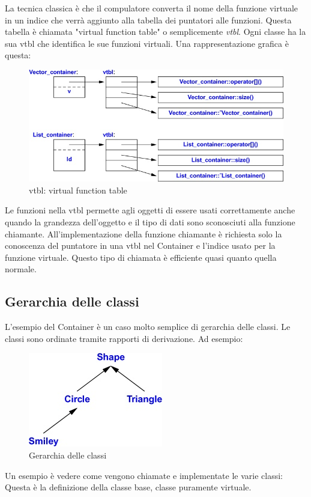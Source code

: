\documentclass[11pt,a4paper]{book}
\begin{document}
La tecnica classica è che il compulatore converta il nome della funzione virtuale in un indice che verrà aggiunto alla tabella dei puntatori alle funzioni. Questa tabella è chiamata "virtual function table" o semplicemente \emph{vtbl}. Ogni classe ha la sua vtbl che identifica le sue funzioni virtuali. Una rappresentazione grafica è questa:
\begin{figure}[h!]
	\begin{center}
		\includegraphics[scale=0.6]{img/004.jpg}
		\caption{vtbl: virtual function table}
		\label{fig: 004}
	\end{center}
\end{figure}

Le funzioni nella vtbl permette agli oggetti di essere usati correttamente anche quando la grandezza dell'oggetto e il tipo di dati sono sconosciuti alla funzione chiamante. All'implementazione della funzione chiamante è richiesta solo la conoscenza del puntatore in una vtbl nel Container e l'indice usato per la funzione virtuale. Questo tipo di chiamata è efficiente quasi quanto quella normale.

\subsection{Gerarchia delle classi}
L'esempio del Container è un caso molto semplice di gerarchia delle classi. Le classi sono ordinate tramite rapporti di derivazione. Ad esempio:
\begin{figure}[h!]
	\begin{center}
		\includegraphics[scale=0.6]{img/005.jpg}
		\caption{Gerarchia delle classi}
		\label{fig: 005}
	\end{center}
\end{figure}
Un esempio è vedere come vengono chiamate e implementate le varie classi:
\label{code: 033}
Questa è la definizione della classe base, classe puramente virtuale.
\end{document}
